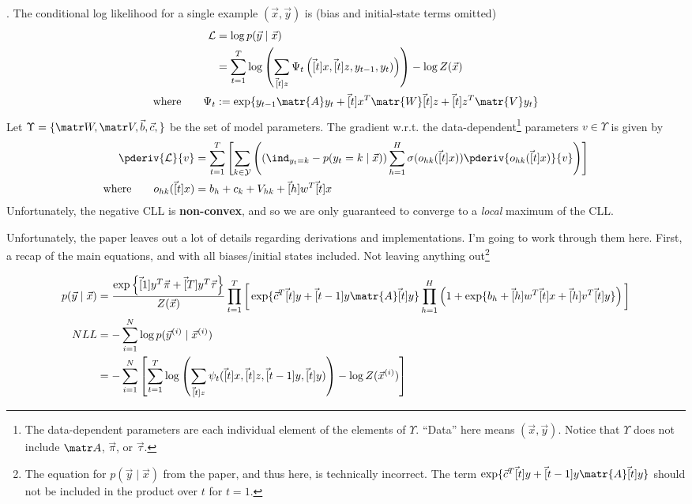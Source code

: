 \documentclass[11pt]{article}
\begin{document}
\myspace 
\p {}. The conditional log likelihood for a single example $(\vec x, \vec y)$ is (bias and initial-state terms omitted) 
\begin{align}
\mathcal{L} &= \log p(\vec y \mid \vec x) \\
&= \sum_{t = 1}^{T} \log \left( 
\sum_{\vec[t]{z}} \Psi_t\left( \vec[t]{x}, \vec[t]{z}, y_{t-1}, y_t)  \right)
\right) - \log Z(\vec x) \\
\text{where}\qquad \Psi_t &:= \exp\{  y_{t-1} \matr{A} y_t + \vec[t]{x}^T \matr{W} \vec[t]{z} + \vec[t]{z}^T \matr{V} y_t  \}
\end{align}
Let $\Upsilon = \{\matr W, \matr V, \vec b, \vec c, \}$ be the set of model parameters. The gradient w.r.t. the data-dependent\footnote{The data-dependent parameters are each individual element of the elements of $\Upsilon$. ``Data'' here means $(\vec x, \vec y)$. Notice that $\Upsilon$ does not include $\matr A$, $\vec{\pi}$, or $\vec{\tau}$.} parameters $v \in \Upsilon$ is given by
\begin{align}
\pderiv{\mathcal L}{v} 
&= \sum_{t=1}^{T} \left[
\sum_{k \in \mathcal{Y}} \left(
\left(  \ind_{y_t = k}   -  p(y_t = k \mid \vec x) \right) \sum_{h = 1}^{H} \sigma(o_{hk}(\vec[t]{x})) \pderiv{o_{hk}(\vec[t]{x})}{ v }
\right)
\right] 
\\
\text{where}\qquad
o_{hk}(\vec[t]{x}) &= b_h + c_k + V_{hk} + \vec[h]{w}^T \vec[t]{x}
\end{align}
Unfortunately, the negative CLL is \textbf{non-convex}, and so we are only guaranteed to converge to a \textit{local} maximum of the CLL. 



Unfortunately, the paper leaves out a lot of details regarding derivations and implementations. I'm going to work through them here. First, a recap of the main equations, and with all biases/initial states included. Not leaving anything out\footnote{The equation for $p(\vec y \mid \vec x)$ from the paper, and thus here, is technically incorrect. The term $\exp\{ \vec{c}^T \vec[t]{y} + \vec[t-1]{y}\matr{A}\vec[t]{y}   \}$ should not be included in the product over $t$ for $t=1$.}
\begin{small}
	\begin{align}
	p(\vec y \mid \vec x) 
	&= \frac{\exp\left\{ \vec[1]{y}^T \vec{\pi} + \vec[T]{y}^T \vec{\tau}  \right\}}{Z(\vec x)} \prod_{t=1}^{T}\bigg[ 
	\exp\{ \vec{c}^T \vec[t]{y} + \vec[t-1]{y}\matr{A}\vec[t]{y}   \}  
	\prod_{h = 1}^{H} \left( 1 + \exp\{ b_h + \vec[h]{w}^T \vec[t]{x} + \vec[h]{v}^T \vec[t]{y}  \} \right)	\bigg] \\
	NLL 
	&= - \sum_{i=1}^{N} \log p(\vec{y}^{(i)} \mid \vec{x}^{(i)}) \\
	&= - \sum_{i=1}^{N} \left[ \sum_{t = 1}^{T} \log \left( \sum_{\vec[t]{z}} \psi_t(\vec[t]{x}, \vec[t]{z}, \vec[t-1]{y}, \vec[t]{y}) \right) 
	- \log Z(\vec{x}^{(i)}) \right] 
	\end{align}
\end{small}
\end{document}
